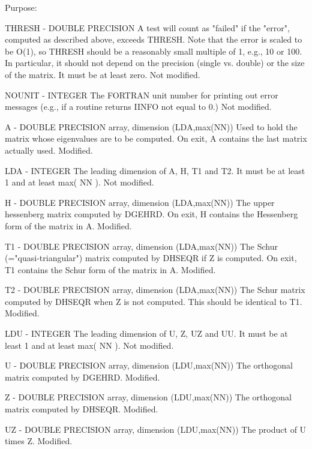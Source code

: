 \begin{DoxyParagraph}{Purpose\+: }
\begin{DoxyVerb}
  THRESH - DOUBLE PRECISION
           A test will count as "failed" if the "error", computed as
           described above, exceeds THRESH.  Note that the error
           is scaled to be O(1), so THRESH should be a reasonably
           small multiple of 1, e.g., 10 or 100.  In particular,
           it should not depend on the precision (single vs. double)
           or the size of the matrix.  It must be at least zero.
           Not modified.

  NOUNIT - INTEGER
           The FORTRAN unit number for printing out error messages
           (e.g., if a routine returns IINFO not equal to 0.)
           Not modified.

  A      - DOUBLE PRECISION array, dimension (LDA,max(NN))
           Used to hold the matrix whose eigenvalues are to be
           computed.  On exit, A contains the last matrix actually
           used.
           Modified.

  LDA    - INTEGER
           The leading dimension of A, H, T1 and T2.  It must be at
           least 1 and at least max( NN ).
           Not modified.

  H      - DOUBLE PRECISION array, dimension (LDA,max(NN))
           The upper hessenberg matrix computed by DGEHRD.  On exit,
           H contains the Hessenberg form of the matrix in A.
           Modified.

  T1     - DOUBLE PRECISION array, dimension (LDA,max(NN))
           The Schur (="quasi-triangular") matrix computed by DHSEQR
           if Z is computed.  On exit, T1 contains the Schur form of
           the matrix in A.
           Modified.

  T2     - DOUBLE PRECISION array, dimension (LDA,max(NN))
           The Schur matrix computed by DHSEQR when Z is not computed.
           This should be identical to T1.
           Modified.

  LDU    - INTEGER
           The leading dimension of U, Z, UZ and UU.  It must be at
           least 1 and at least max( NN ).
           Not modified.

  U      - DOUBLE PRECISION array, dimension (LDU,max(NN))
           The orthogonal matrix computed by DGEHRD.
           Modified.

  Z      - DOUBLE PRECISION array, dimension (LDU,max(NN))
           The orthogonal matrix computed by DHSEQR.
           Modified.

  UZ     - DOUBLE PRECISION array, dimension (LDU,max(NN))
           The product of U times Z.
           Modified.


\end{DoxyVerb}
\end{DoxyParagraph}
